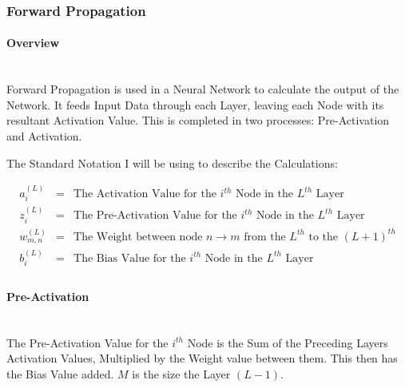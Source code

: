 \begin{flushleft}
            \subsubsection{Forward Propagation}
                \paragraph{Overview} \mbox{} \\
                    \vspace{0.2cm}
                    Forward Propagation is used in a Neural Network to calculate the output of the Network. It feeds Input Data through each
                    Layer, leaving each Node with its resultant Activation Value. This is completed in two processes: Pre-Activation and Activation. \\
                    \vspace{0.4cm}
                    \centerline{The Standard Notation I will be using to describe the Calculations:}

                    \begin{addmargin}[2em]{0em}        
                        \begin{eqnarray*}
                            a^{(L)}_{i} &=&  \text{The Activation Value for the $i^{th}$ Node in the $L^{th}$ Layer} \\
                            z^{(L)}_{i} &=&  \text{The Pre-Activation Value for the $i^{th}$ Node in the $L^{th}$ Layer} \\
                            w^{(L)}_{m,n} &=&  \text{The Weight between node $n \rightarrow m$ from the $L^{th}$ to the $(L + 1)^{th}$} \\
                            b^{(L)}_{i} &=& \text{The Bias Value for the $i^{th}$ Node in the $L^{th}$ Layer} \\
                        \end{eqnarray*}             
                    \end{addmargin}
                    \vspace{0.4cm}

                \paragraph{Pre-Activation} \mbox{} \\
                    \vspace{0.2cm}
                    The Pre-Activation Value for the $i^{th}$ Node is the Sum of the Preceding Layers Activation Values, Multiplied by the Weight value
                    between them. This then has the Bias Value added. $M$ is the size the Layer $(L - 1)$.


\end{flushleft}
